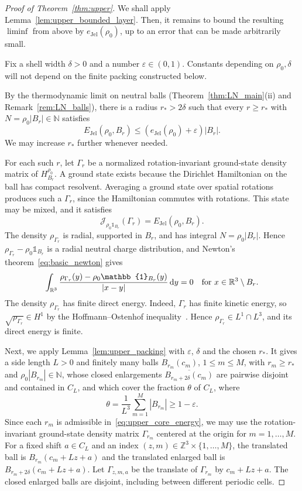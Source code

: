 \documentclass[final,reqno]{amsart}
\theoremstyle{remark}
\theoremstyle{definition}
\renewcommand{\le}{\leqslant}
\renewcommand{\ge}{\geqslant}
\newcommand{\RR}{\mathbb{R}}
\newcommand{\ZZ}{\mathbb{Z}}
\newcommand{\NN}{\mathbb{N}}
\newcommand{\iden}{\mathbb{1}}
\newcommand{\Jel}{\mathrm{Jel}}
\begin{document}
\begin{proof}[Proof of Theorem~\ref{thm:upper}]
We shall apply Lemma~\ref{lem:upper_bounded_layer}. Then, it remains to bound the resulting $\liminf$ from above by $e_\Jel(\rho_0)$, up to an error that can be made arbitrarily small.

Fix a shell width $\delta>0$ and a number $\varepsilon\in(0,1)$. Constants depending on $\rho_0,\delta$ will not depend on the finite packing constructed below.

By the thermodynamic limit on neutral balls (Theorem~\ref{thm:LN_main}(ii) and Remark~\ref{rem:LN_balls}), there is a radius $r_*>2\delta$ such that every $r\ge r_*$ with $N=\rho_0|B_r|\in\NN$ satisfies
\begin{equation}\label{eq:upper_core_energy}
E_\Jel(\rho_0,B_r)
\le(e_\Jel(\rho_0)+\varepsilon)|B_r|.
\end{equation}
We may increase $r_*$ further whenever needed.

For each such $r$, let $\Gamma_r$ be a normalized rotation-invariant ground-state density matrix of $H^{\rho_0}_{B_r}$. A ground state exists because the Dirichlet Hamiltonian on the ball has compact resolvent. Averaging a ground state over spatial rotations produces such a $\Gamma_r$, since the Hamiltonian commutes with rotations. This state may be mixed, and it satisfies
\[
\mathcal J_{\rho_0\iden_{B_r}}(\Gamma_r)
=E_\Jel(\rho_0,B_r).
\]
The density $\rho_{\Gamma_r}$ is radial, supported in $B_r$, and has integral $N=\rho_0|B_r|$. Hence $\rho_{\Gamma_r}-\rho_0\iden_{B_r}$ is a radial neutral charge distribution, and Newton's theorem~\eqref{eq:basic_newton} gives
\begin{equation}\label{eq:upper_core_zero_potential}
\int_{\RR^3}\frac{\rho_{\Gamma_r}(y)-\rho_0\iden_{B_r}(y)}{|x-y|}\,\mathrm dy=0\quad\hbox{for }x\in\RR^3\setminus B_r.
\end{equation}
The density $\rho_{\Gamma_r}$ has finite direct energy. Indeed, $\Gamma_r$ has finite kinetic energy, so $\sqrt{\rho_{\Gamma_r}}\in H^1$ by the Hoffmann--Ostenhof inequality~\cite{hoffmann1977schrodinger}. Hence $\rho_{\Gamma_r}\in L^1\cap L^3$, and its direct energy is finite.

Next, we apply Lemma~\ref{lem:upper_packing} with $\varepsilon$, $\delta$ and the chosen $r_*$. It gives a side length $L>0$ and finitely many balls $B_{r_m}(c_m)$, $1\le m\le M$, with $r_m\ge r_*$ and $\rho_0|B_{r_m}|\in\NN$, whose closed enlargements $\overline{B_{r_m+2\delta}(c_m)}$ are pairwise disjoint and contained in $C_L$, and which cover the fraction $\theta$ of $C_L$, where
\[
\theta=\frac1{L^3}\sum_{m=1}^M|B_{r_m}|\ge1-\varepsilon.
\]
Since each $r_m$ is admissible in~\eqref{eq:upper_core_energy}, we may use the rotation-invariant ground-state density matrix $\Gamma_{r_m}$ centered at the origin for $m=1,\dots,M$.
For a fixed shift $a\in C_L$ and an index $(z,m)\in\ZZ^3\times\{1,\dots,M\}$, the translated ball is $B_{r_m}(c_m+Lz+a)$ and the translated enlarged ball is $B_{r_m+2\delta}(c_m+Lz+a)$. Let $\Gamma_{z,m,a}$ be the translate of $\Gamma_{r_m}$ by $c_m+Lz+a$. The closed enlarged balls are disjoint, including between different periodic cells.


\end{proof}
\end{document}
